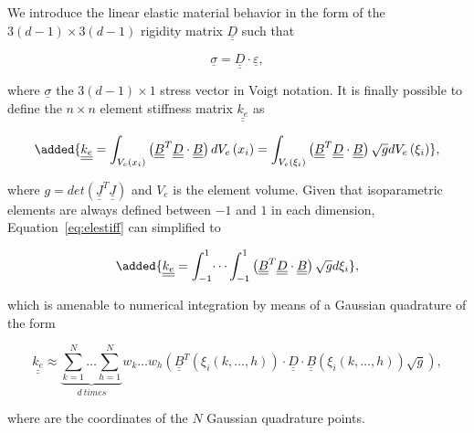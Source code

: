 \documentclass[review]{elsarticle}
\begin{document}
We introduce the linear elastic material behavior in the form of the $3\left(d-1\right)\times 3\left(d-1\right)$ rigidity matrix $\underline{\underline{D}}$ such that

\begin{equation}
\underline{\sigma}=\underline{\underline{D}}\cdot\underline{\varepsilon},
\end{equation}

where $\underline{\sigma}$ the $3\left(d-1\right)\times 1$ stress vector in Voigt notation. It is finally possible to define the $n\times n$ element stiffness matrix $\underline{\underline{k_{e}}}$ as 

\begin{equation}\label{eq:elestiff}
\added{\underline{\underline{k_{e}}}=\int_{V_{e}\left(x_{i}\right)}\left(\underline{\underline{B}}^{T}\underline{\underline{D}}\cdot\underline{\underline{B}}\right)dV_{e}\left(x_{i}\right)=\int_{V_{e}\left(\xi_{i}\right)}\left(\underline{\underline{B}}^{T}\underline{\underline{D}}\cdot\underline{\underline{B}}\right)\sqrt{g}dV_{e}\left(\xi_{i}\right)},
\end{equation}

where $g=det\left(\underline{\underline{J}}^{T}\underline{\underline{J}}\right)$ and $V_{e}$ is the element volume. Given that isoparametric elements are always defined between $-1$ and $1$ in each dimension, Equation~\ref{eq:elestiff} can simplified to

\begin{equation}
\added{\underline{\underline{k_{e}}}=\int_{-1}^{1}\dots\int_{-1}^{1}\left(\underline{\underline{B}}^{T}\underline{\underline{D}}\cdot\underline{\underline{B}}\right)\sqrt{g}d\xi_{i}},
\end{equation}

which is amenable to numerical integration by means of a Gaussian quadrature of the form

\begin{equation}\label{eq:elstiffnum}
\underline{\underline{k_{e}}}\approx \underbrace{\sum_{k=1}^{N}\dots\sum_{h=1}^{N}}_{d\ times}w_{k}\dots w_{h}\left(\underline{\underline{B}}^{T}\left(\xi_{i}\left(k, \dots,h\right)\right)\cdot\underline{\underline{D}}\cdot\underline{\underline{B}}\left(\xi_{i}\left(k, \dots,h\right)\right)\sqrt{g}\right),
\end{equation}

where  are the coordinates of the $N$ Gaussian quadrature points. 
\end{document}
